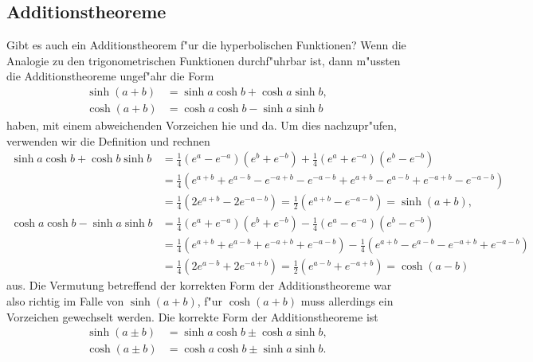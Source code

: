 \subsection{Additionstheoreme}
Gibt es auch ein Additionstheorem f"ur die hyperbolischen Funktionen?
Wenn die Analogie zu den trigonometrischen Funktionen durchf"uhrbar ist,
dann m"ussten die Additionstheoreme ungef"ahr die Form
\begin{align*}
\sinh(a+b)&=\sinh a\cosh b + \cosh a\sinh b,\\
\cosh(a+b)&=\cosh a\cosh b - \sinh a\sinh b
\end{align*}
haben, mit einem abweichenden Vorzeichen hie und da.
Um dies nachzupr"ufen, verwenden wir die Definition und rechnen
\begin{align*}
\sinh a\cosh b + \cosh b\sinh b
&=
\frac14(e^a-e^{-a})(e^b+e^{-b})
+
\frac14(e^a+e^{-a})(e^b-e^{-b})
\\
&=\frac14(e^{a+b}+e^{a-b}-e^{-a+b}-e^{-a-b} + e^{a+b}-e^{a-b}+e^{-a+b}-e^{-a-b})
\\
&=
\frac14(2e^{a+b}-2e^{-a-b})
=
\frac12(e^{a+b}-e^{-a-b})=\sinh(a+b),
\\
\cosh a\cosh b-\sinh a\sinh b
&=
\frac14(e^a+e^{-a})(e^b+e^{-b})
-
\frac14(e^a-e^{-a})(e^b-e^{-b})
\\
&=
\frac14(e^{a+b}+e^{a-b}+e^{-a+b}+e^{-a-b})
-
\frac14(e^{a+b}-e^{a-b}-e^{-a+b}+e^{-a-b})
\\
&=
\frac14(2e^{a-b}+2e^{-a+b})
=
\frac12(e^{a-b}+e^{-a+b})=\cosh(a-b)
\end{align*}
aus.
Die Vermutung betreffend der korrekten Form der Additionstheoreme
war also richtig im Falle von $\sinh(a+b)$, f"ur $\cosh(a+b)$ muss
allerdings ein Vorzeichen gewechselt werden.
Die korrekte Form der Additionstheoreme ist
\begin{align*}
\sinh(a\pm b)&=\sinh a\cosh b \pm \cosh a\sinh b,\\
\cosh(a\pm b)&=\cosh a\cosh b \pm \sinh a\sinh b.
\end{align*}

